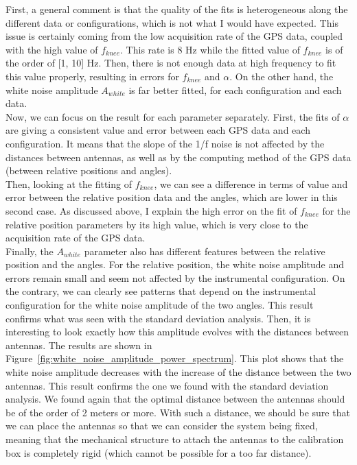 \documentclass[../../thesis.tex]{subfiles}
\begin{document}
First, a general comment is that the quality of the fits is heterogeneous along the different data or configurations, which is not what I would have expected. This issue is certainly coming from the low acquisition rate of the GPS data, coupled with the high value of $f_{knee}$. This rate is 8 Hz while the fitted value of $f_{knee}$ is of the order of [1, 10] Hz. Then, there is not enough data at high frequency to fit this value properly, resulting in errors for $f_{knee}$ and $\alpha$. On the other hand, the white noise amplitude $A_{white}$ is far better fitted, for each configuration and each data. \\
Now, we can focus on the result for each parameter separately. First, the fits of $\alpha$ are giving a consistent value and error between each GPS data and each configuration. It means that the slope of the 1/f noise is not affected by the distances between antennas, as well as by the computing method of the GPS data (between relative positions and angles). \\
Then, looking at the fitting of $f_{knee}$, we can see a difference in terms of value and error between the relative position data and the angles, which are lower in this second case. As discussed above, I explain the high error on the fit of $f_{knee}$ for the relative position parameters by its high value, which is very close to the acquisition rate of the GPS data. \\
Finally, the $A_{white}$ parameter also has different features between the relative position and the angles. For the relative position, the white noise amplitude and errors remain small and seem not affected by the instrumental configuration. On the contrary, we can clearly see patterns that depend on the instrumental configuration for the white noise amplitude of the two angles. This result confirms what was seen with the standard deviation analysis. Then, it is interesting to look exactly how this amplitude evolves with the distances between antennas. The results are shown in Figure~\ref{fig:white_noise_amplitude_power_spectrum}. This plot shows that the white noise amplitude decreases with the increase of the distance between the two antennas. This result confirms the one we found with the standard deviation analysis. We found again that the optimal distance between the antennas should be of the order of 2 meters or more. With such a distance, we should be sure that we can place the antennas so that we can consider the system being fixed, meaning that the mechanical structure to attach the antennas to the calibration box is completely rigid (which cannot be possible for a too far distance).
\end{document}
